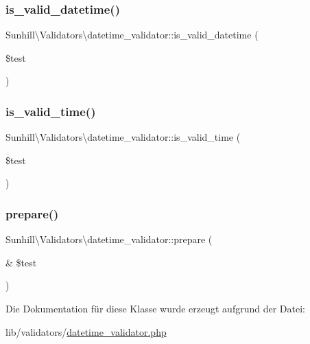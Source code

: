 \subsubsection{\texorpdfstring{is\+\_\+valid\+\_\+datetime()}{is\_valid\_datetime()}}
{\footnotesize\ttfamily Sunhill\textbackslash{}\+Validators\textbackslash{}datetime\+\_\+validator\+::is\+\_\+valid\+\_\+datetime (\begin{DoxyParamCaption}\item[{}]{\$test }\end{DoxyParamCaption})}

\mbox{\label{classSunhill_1_1Validators_1_1datetime__validator_a53b701e2d7a3809802bc36eac382a664}} 
\subsubsection{\texorpdfstring{is\+\_\+valid\+\_\+time()}{is\_valid\_time()}}
{\footnotesize\ttfamily Sunhill\textbackslash{}\+Validators\textbackslash{}datetime\+\_\+validator\+::is\+\_\+valid\+\_\+time (\begin{DoxyParamCaption}\item[{}]{\$test }\end{DoxyParamCaption})}

\mbox{\label{classSunhill_1_1Validators_1_1datetime__validator_a5b54836463c37a14eb5f74286725226e}} 
\subsubsection{\texorpdfstring{prepare()}{prepare()}}
{\footnotesize\ttfamily Sunhill\textbackslash{}\+Validators\textbackslash{}datetime\+\_\+validator\+::prepare (\begin{DoxyParamCaption}\item[{\&}]{\$test }\end{DoxyParamCaption})\hspace{0.3cm}{\ttfamily [protected]}}



Die Dokumentation für diese Klasse wurde erzeugt aufgrund der Datei\+:\begin{DoxyCompactItemize}
\item 
lib/validators/\hyperlink{datetime__validator_8php}{datetime\+\_\+validator.\+php}\end{DoxyCompactItemize}
